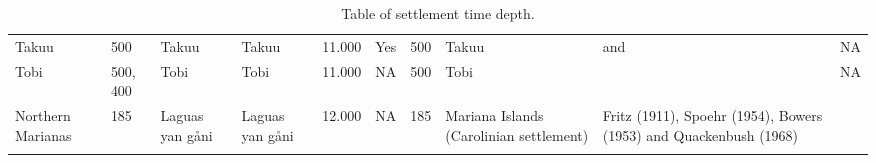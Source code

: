 \begin{longtable}{p{4.5cm}p{2cm}p{2cm}p{2cm}p{4cm}p{4cm}p{4cm}p{4cm}p{4cm}p{4cm}}
  Takuu & 500 & Takuu & Takuu & 11.000 & Yes & 500 & Takuu & \citet{kirch2012basline} and \citet{carson2012recent} & NA \\ 
  Tobi & 500, 400 & Tobi & Tobi & 11.000 & NA & 500 & Tobi & \citet{intoh2007reconnaissance} & NA \\ 
  Northern Marianas & 185 & Laguas yan gåni & Laguas yan gåni & 12.000 & NA & 185 & Mariana Islands (Carolinian settlement) & Fritz (1911), Spoehr (1954), Bowers (1953) and Quackenbush (1968) & \citet{ellis2012saipan} \\ 
   \bottomrule
\caption{Table of settlement time depth.} 
\label{appendix_dates_xtable}
\end{longtable}
